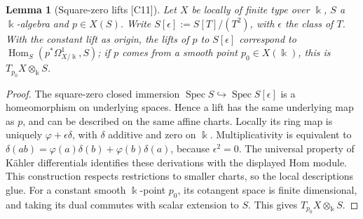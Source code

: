 \documentclass[11pt,oneside]{article}
\numberwithin{equation}{section}
\newtheorem{lemma}[lemma]{Lemma}
\theoremstyle{definition}
\theoremstyle{remark}
\newcommand{\src}[1]{\textup{\textsf{\small[#1]}}}
\newcommand{\Spec}{\operatorname{Spec}}
\newcommand{\Hom}{\operatorname{Hom}}
\begin{document}
\begin{lemma}[Square-zero lifts \src{C11}]\label{odg:cr:lem:tangent}
Let $X$ be locally of finite type over $\Bbbk$, $S$ a $\Bbbk$-algebra and $p\in X(S)$.
Write $S[\epsilon]:=S[T]/(T^2)$, with $\epsilon$ the class of $T$.
With the constant lift as origin, the lifts of $p$ to $S[\epsilon]$
correspond to $\Hom_S(p^*\Omega^1_{X/\Bbbk},S)$; if $p$ comes from a smooth point
$p_0\in X(\Bbbk)$, this is $T_{p_0}X\otimes_\Bbbk S$.
\end{lemma}
\begin{proof}
The square-zero closed immersion $\Spec S\hookrightarrow\Spec S[\epsilon]$
is a homeomorphism on underlying spaces. Hence a lift has the same
underlying map as $p$, and can be described on the same affine charts.
Locally its ring map is uniquely $\varphi+\epsilon\delta$, with
$\delta$ additive and zero on $\Bbbk$. Multiplicativity is equivalent to
$\delta(ab)=\varphi(a)\delta(b)+\varphi(b)\delta(a)$, because
$\epsilon^2=0$. The universal property of K\"ahler differentials identifies
these derivations with the displayed Hom module. This construction
respects restrictions to smaller charts, so the local descriptions glue.
For a constant smooth $\Bbbk$-point $p_0$, its cotangent space is finite
dimensional, and taking its dual commutes with scalar extension to $S$.
This gives $T_{p_0}X\otimes_\Bbbk S$.
\end{proof}
\end{document}
